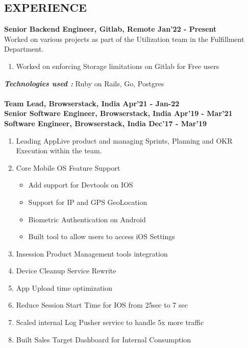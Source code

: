 \documentclass[line, margin]{res}
\begin{document}
\address{ +91 9833471993, surajtripathi793@gmail.com}
\begin{resume}

\section{EXPERIENCE} 
\textbf{Senior Backend Engineer, Gitlab, Remote \hfill Jan'22 - Present} \\
Worked on various projects as part of the Utilization team in the Fulfillment Department.
\begin{enumerate}
  \item Worked on enforcing Storage limitations on Gitlab for Free users
\end{enumerate}
\textbf{\textit{Technologies used : }} Ruby on Rails, Go, Postgres\\
\\
\textbf{Team Lead, Browserstack, India \hfill Apr'21 - Jan-22} \\
\textbf{Senior Software Engineer, Browserstack, India \hfill Apr'19 - Mar'21} \\
\textbf{Software Engineer, Browserstack, India \hfill Dec'17 - Mar'19} \\
\begin{enumerate}
   \item Leading AppLive product and managing Sprints, Planning and OKR Execution within the team.
   \item Core Mobile OS Feature Support
   \begin{itemize}
     \item Add support for Devtools on IOS
     \item Support for IP and GPS GeoLocation
     \item Biometric Authentication on Android
     \item Built tool to allow users to access iOS Settings
   \end{itemize}
   \item Insession Product Management tools integration
   \item Device Cleanup Service Rewrite
   \item App Upload time optimization
   \item Reduce Session Start Time for IOS from 25sec to 7 sec
   \item Scaled internal Log Pusher service to handle 5x more traffic
   \item Built Sales Target Dashboard for Internal Consumption
\end{enumerate}

\end{resume}
\end{document}
